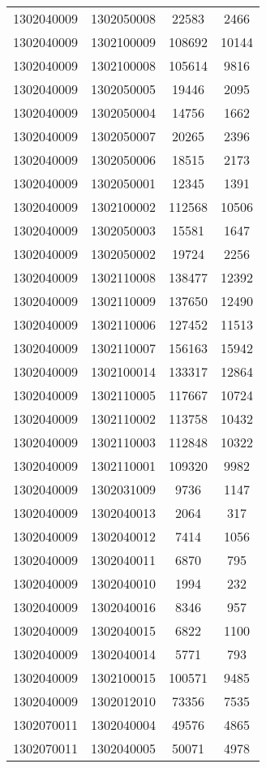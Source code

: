 \begin{longtable}[h]{llcc}
		1302040009 & 1302050008 & 22583 & 2466\\
		1302040009 & 1302100009 & 108692 & 10144\\
		1302040009 & 1302100008 & 105614 & 9816\\
		1302040009 & 1302050005 & 19446 & 2095\\
		1302040009 & 1302050004 & 14756 & 1662\\
		1302040009 & 1302050007 & 20265 & 2396\\
		1302040009 & 1302050006 & 18515 & 2173\\
		1302040009 & 1302050001 & 12345 & 1391\\
		1302040009 & 1302100002 & 112568 & 10506\\
		1302040009 & 1302050003 & 15581 & 1647\\
		1302040009 & 1302050002 & 19724 & 2256\\
		1302040009 & 1302110008 & 138477 & 12392\\
		1302040009 & 1302110009 & 137650 & 12490\\
		1302040009 & 1302110006 & 127452 & 11513\\
		1302040009 & 1302110007 & 156163 & 15942\\
		1302040009 & 1302100014 & 133317 & 12864\\
		1302040009 & 1302110005 & 117667 & 10724\\
		1302040009 & 1302110002 & 113758 & 10432\\
		1302040009 & 1302110003 & 112848 & 10322\\
		1302040009 & 1302110001 & 109320 & 9982\\
		1302040009 & 1302031009 & 9736 & 1147\\
		1302040009 & 1302040013 & 2064 & 317\\
		1302040009 & 1302040012 & 7414 & 1056\\
		1302040009 & 1302040011 & 6870 & 795\\
		1302040009 & 1302040010 & 1994 & 232\\
		1302040009 & 1302040016 & 8346 & 957\\
		1302040009 & 1302040015 & 6822 & 1100\\
		1302040009 & 1302040014 & 5771 & 793\\
		1302040009 & 1302100015 & 100571 & 9485\\
		1302040009 & 1302012010 & 73356 & 7535\\
		1302070011 & 1302040004 & 49576 & 4865\\
		1302070011 & 1302040005 & 50071 & 4978\\

\end{longtable}
